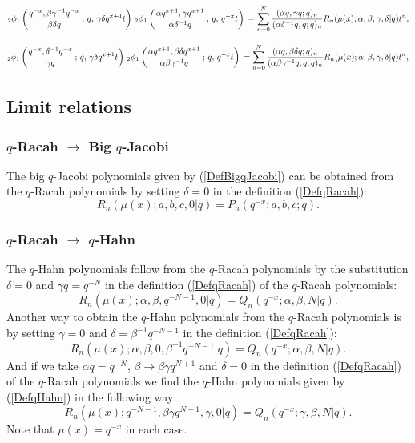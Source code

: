 \documentclass[envcountchap,graybox]{svmono}
\newcounter{rom}
\newcommand{\qhyp}[5]{\mbox{}_{#1}{\phi}_{#2}
\left(\genfrac{}{}{0pt}{}{#3}{#4}\,;\,q,\,#5\right)}
\newcommand{\qhyp}[5]{\,\mbox{}_{#1}\phi_{#2}\!\left(
  \genfrac{}{}{0pt}{}{#3}{#4};#5\right)}
\begin{document}
\begin{equation}
\label{GenqRacah2}
\qhyp{2}{1}{q^{-x},\beta\gamma^{-1}q^{-x}}{\beta\delta q}{\gamma\delta q^{x+1}t}\,
\qhyp{2}{1}{\alpha q^{x+1},\gamma q^{x+1}}{\alpha\delta^{-1}q}{q^{-x}t}
{}=\sum_{n=0}^N\frac{(\alpha q,\gamma q;q)_n}{(\alpha\delta^{-1}q,q;q)_n}
R_n(\mu(x);\alpha,\beta,\gamma,\delta|q)t^n,
\end{equation}

\begin{equation}
\label{GenqRacah3}
\qhyp{2}{1}{q^{-x},\delta^{-1}q^{-x}}{\gamma q}{\gamma\delta q^{x+1}t}\,
\qhyp{2}{1}{\alpha q^{x+1},\beta\delta q^{x+1}}{\alpha\beta\gamma^{-1}q}{q^{-x}t}
{}=\sum_{n=0}^N\frac{(\alpha q,\beta\delta q;q)_n}{(\alpha\beta\gamma^{-1}q,q;q)_n}
R_n(\mu(x);\alpha,\beta,\gamma,\delta|q)t^n,
\end{equation}

\subsection*{Limit relations}

\subsubsection*{$q$-Racah $\rightarrow$ Big $q$-Jacobi}
The big $q$-Jacobi polynomials given by (\ref{DefBigqJacobi}) can be obtained
from the $q$-Racah polynomials by setting $\delta=0$ in the definition
(\ref{DefqRacah}):
\begin{equation}
R_n(\mu(x);a,b,c,0|q)=P_n(q^{-x};a,b,c;q).
\end{equation}

\subsubsection*{$q$-Racah $\rightarrow$ $q$-Hahn}
The $q$-Hahn polynomials follow from the $q$-Racah polynomials by the substitution
$\delta=0$ and $\gamma q=q^{-N}$ in the definition (\ref{DefqRacah}) of the
$q$-Racah polynomials:
\begin{equation}
R_n(\mu(x);\alpha,\beta,q^{-N-1},0|q)=Q_n(q^{-x};\alpha,\beta,N|q).
\end{equation}
Another way to obtain the $q$-Hahn polynomials from the $q$-Racah
polynomials is by setting $\gamma=0$ and $\delta=\beta^{-1}q^{-N-1}$ in the definition
(\ref{DefqRacah}):
\begin{equation}
R_n(\mu(x);\alpha,\beta,0,\beta^{-1}q^{-N-1}|q)=Q_n(q^{-x};\alpha,\beta,N|q).
\end{equation}
And if we take $\alpha q=q^{-N}$, $\beta\rightarrow\beta\gamma q^{N+1}$ and $\delta=0$ in the
definition (\ref{DefqRacah}) of the $q$-Racah polynomials we find the
$q$-Hahn polynomials given by (\ref{DefqHahn}) in the following way:
\begin{equation}
R_n(\mu(x);q^{-N-1},\beta\gamma q^{N+1},\gamma,0|q)=Q_n(q^{-x};\gamma,\beta,N|q).
\end{equation}
Note that $\mu(x)=q^{-x}$ in each case.
\end{document}
